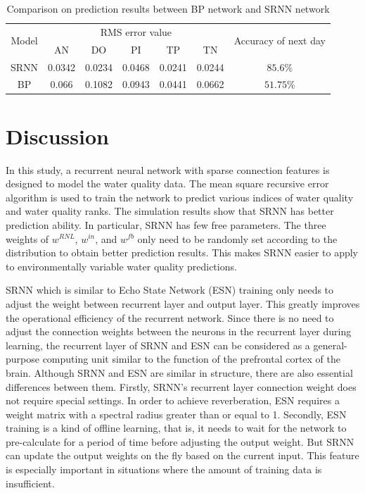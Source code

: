 \documentclass[runningheads]{llncs}
\begin{document}
\begin{table}[htbp] 
\centering
\caption{Comparison on prediction results between BP network and SRNN network}
\label{Comparison on prediction results between BP network and SRNN network}
\begin{tabular}{ccccccc} 
\toprule 
\multirow{2}{*}{Model}&\multicolumn{5}{c}{RMS error value}&\multirow{2}{4.25cm}{Accuracy of next day}\\
\cline{2-6}
&AN &DO&PI&TP&TN&\\
\midrule 
SRNN&0.0342&0.0234&0.0468&0.0241&0.0244&$85.6\%$\\
BP&0.066&0.1082&0.0943&0.0441&0.0662&$51.75\%$\\
\bottomrule 
\end{tabular} 
\end{table}

\section{Discussion}
In this study, a recurrent neural network with sparse connection features is 
designed to model the water quality data. The mean square recursive error algorithm 
is used to train the network to predict various indices of water quality 
and water quality ranks. The simulation results show that SRNN has better 
prediction ability. In particular, SRNN has few free parameters. The three 
weights of $w^{RNL}$, $w^{in}$, and $w^{fb}$ only need to be randomly set 
according to the distribution to obtain better prediction results.
This makes SRNN easier to apply to environmentally variable water 
quality predictions.

SRNN which is similar to Echo State Network (ESN) training only needs 
to adjust the weight between recurrent layer and output layer. 
This greatly improves the operational efficiency of the recurrent network. 
Since there is no need to adjust the connection weights between the neurons 
in the recurrent layer during learning, the recurrent layer of SRNN 
and ESN can be considered as a general-purpose computing unit similar
to the function of the prefrontal cortex of the brain\cite{RN20,RN21}. 
Although SRNN and ESN are similar in structure, there are also essential 
differences between them. Firstly, SRNN's recurrent layer connection 
weight does not require special settings. In order to achieve 
reverberation, ESN requires a weight matrix with a spectral radius 
greater than or equal to 1. Secondly, ESN training is a kind of 
offline learning, that is, it needs to wait for the network to 
pre-calculate for a period of time before adjusting the output 
weight. But SRNN can update the output weights on the fly based 
on the current input. This feature is especially important 
in situations where the amount of training data is insufficient. 
\end{document}
